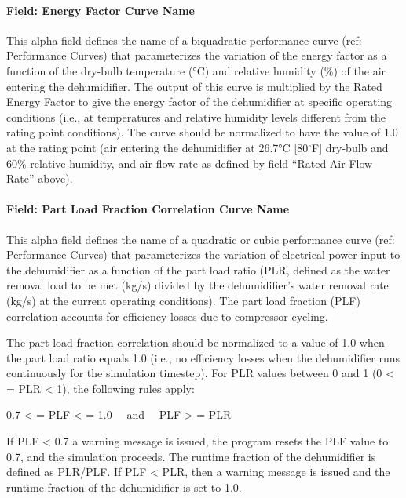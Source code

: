 \paragraph{Field: Energy Factor Curve Name}\label{field-energy-factor-curve-name}

This alpha field defines the name of a biquadratic performance curve (ref: Performance Curves) that parameterizes the variation of the energy factor as a function of the dry-bulb temperature (\si{\degreeCelsius}) and relative humidity (\%) of the air entering the dehumidifier. The output of this curve is multiplied by the Rated Energy Factor to give the energy factor of the dehumidifier at specific operating conditions (i.e., at temperatures and relative humidity levels different from the rating point conditions). The curve should be normalized to have the value of 1.0 at the rating point (air entering the dehumidifier at 26.7\si{\degreeCelsius} {[}80$^\circ$F{]} dry-bulb and 60\% relative humidity, and air flow rate as defined by field ``Rated Air Flow Rate'' above).

\paragraph{Field: Part Load Fraction Correlation Curve Name}\label{field-part-load-fraction-correlation-curve-name-000}

This alpha field defines the name of a quadratic or cubic performance curve (ref: Performance Curves) that parameterizes the variation of electrical power input to the dehumidifier as a function of the part load ratio (PLR, defined as the water removal load to be met (kg/s) divided by the dehumidifier's water removal rate (kg/s) at the current operating conditions). The part load fraction (PLF) correlation accounts for efficiency losses due to compressor cycling.

The part load fraction correlation should be normalized to a value of 1.0 when the part load ratio equals 1.0 (i.e., no efficiency losses when the dehumidifier runs continuously for the simulation timestep). For PLR values between 0 and 1 (0 \textless{} = PLR \textless{} 1), the following rules apply:

0.7 \textless{} = PLF \textless{} = 1.0~~ and~~ PLF \textgreater{} = PLR

If PLF \textless{} 0.7 a warning message is issued, the program resets the PLF value to 0.7, and the simulation proceeds. The runtime fraction of the dehumidifier is defined as PLR/PLF. If PLF \textless{} PLR, then a warning message is issued and the runtime fraction of the dehumidifier is set to 1.0.

